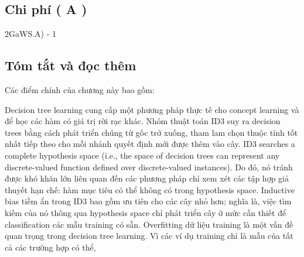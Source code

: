 \subsection{Chi phí ( A )}

2GaWS.A) - 1

\subsection{Tóm tắt và đọc thêm}

Các điểm chính của chương này bao gồm:

Decision tree learning cung cấp một phương pháp thực tế cho concept learning và để học các hàm có giá trị rời rạc khác. Nhóm thuật toán ID3 suy ra decision trees bằng cách phát triển chúng từ gốc trở xuống, tham lam chọn thuộc tính tốt nhất tiếp theo cho mỗi nhánh quyết định mới được thêm vào cây. ID3 searches a complete hypothesis space (i.e., the space of decision trees can represent any discrete-valued function defined over discrete-valued instances). Do đó, nó tránh được khó khăn lớn liên quan đến các phương pháp chỉ xem xét các tập hợp giả thuyết hạn chế: hàm mục tiêu có thể không có trong hypothesis space. Inductive bias tiềm ẩn trong ID3 bao gồm ưu tiên cho các cây nhỏ hơn; nghĩa là, việc tìm kiếm của nó thông qua hypothesis space chỉ phát triển cây ở mức cần thiết để classification các mẫu training có sẵn. Overfitting dữ liệu training là một vấn đề quan trọng trong decision tree learning. Vì các ví dụ training chỉ là mẫu của tất cả các trường hợp có thể,


